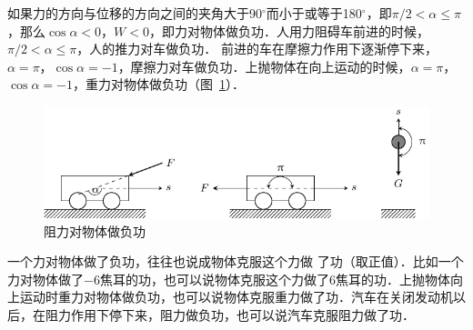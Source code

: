如果力的方向与位移的方向之间的夹角大于90$^\circ$而小于或等于180$^\circ$，即$\pi/2<\alpha\le \pi$，那么$\cos\alpha <0$，$W<0$，即力对物体做负功．人用力阻碍车前进的时候，$\pi/2<\alpha\le \pi$，人的推力对车做负功．
前进的车在摩擦力作用下逐渐停下来，$\alpha=\pi$，$\cos\alpha=-1$，摩擦力对车做负功．上抛物体在向上运动的时候，$\alpha=\pi$，$\cos\alpha=-1$，重力对物体做负功（图~\ref{fig_A_7-4}）．
\begin{figure}[htbp]
    \centering
    \includegraphics{fig/A/7-4.pdf}
    \caption{阻力对物体做负功}\label{fig_A_7-4}
\end{figure}

一个力对物体做了负功，往往也说成物体克服这个力做
了功（取正值）．比如一个力对物体做了$-6$焦耳的功，也可以说物体克服这个力做了6焦耳的功．上抛物体向上运动时重力对物体做负功，也可以说物体克服重力做了功．汽车在关闭发动机以后，在阻力作用下停下来，阻力做负功，也可以说汽车克服阻力做了功．

